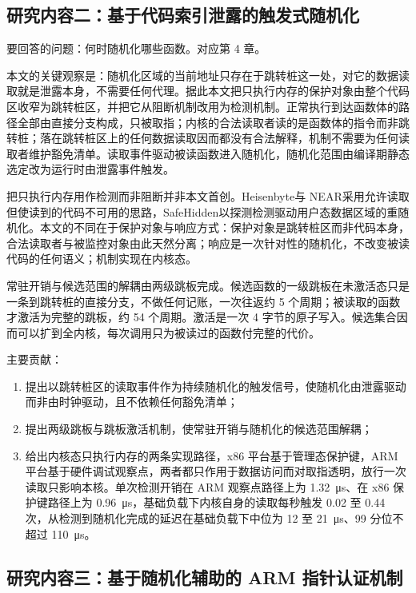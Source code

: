 \subsection{研究内容二：基于代码索引泄露的触发式随机化}

要回答的问题：何时随机化哪些函数。对应第 4 章。

本文的关键观察是：随机化区域的当前地址只存在于跳转桩这一处，对它的数据读取就是泄露本身，不需要任何代理。据此本文把只执行内存的保护对象由整个代码区收窄为跳转桩区，并把它从阻断机制改用为检测机制。正常执行到达函数体的路径全部由直接分支构成，只被取指；内核的合法读取者读的是函数体的指令而非跳转桩；落在跳转桩区上的任何数据读取因而都没有合法解释，机制不需要为任何读取者维护豁免清单。读取事件驱动被读函数进入随机化，随机化范围由编译期静态选定改为运行时由泄露事件触发。

把只执行内存用作检测而非阻断并非本文首创。Heisenbyte\citep{tang2015heisenbyte}与 NEAR\citep{werner2016near}采用允许读取但使读到的代码不可用的思路，SafeHidden\citep{wang2019safehidden}以探测检测驱动用户态数据区域的重随机化。本文的不同在于保护对象与响应方式：保护对象是跳转桩区而非代码本身，合法读取者与被监控对象由此天然分离；响应是一次针对性的随机化，不改变被读代码的任何语义；机制实现在内核态。

常驻开销与候选范围的解耦由两级跳板完成。候选函数的一级跳板在未激活态只是一条到跳转桩的直接分支，不做任何记账，一次往返约 5 个周期；被读取的函数才激活为完整的跳板，约 54 个周期。激活是一次 4 字节的原子写入。候选集合因而可以扩到全内核，每次调用只为被读过的函数付完整的代价。

主要贡献：

\begin{enumerate}
    \item 提出以跳转桩区的读取事件作为持续随机化的触发信号，使随机化由泄露驱动而非由时钟驱动，且不依赖任何豁免清单；
    \item 提出两级跳板与跳板激活机制，使常驻开销与随机化的候选范围解耦；
    \item 给出内核态只执行内存的两条实现路径，x86 平台基于管理态保护键，ARM 平台基于硬件调试观察点，两者都只作用于数据访问而对取指透明，放行一次读取只影响本核。单次检测开销在 ARM 观察点路径上为 1.32~μs、在 x86 保护键路径上为 0.96~μs，基础负载下内核自身的读取每秒触发 0.02 至 0.44 次，从检测到随机化完成的延迟在基础负载下中位为 12 至 21~μs、99 分位不超过 110~μs。
\end{enumerate}

\subsection{研究内容三：基于随机化辅助的 ARM 指针认证机制}

